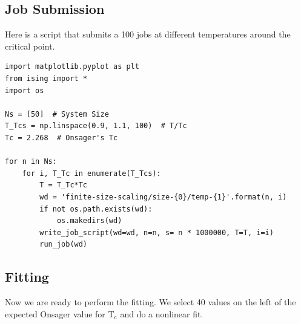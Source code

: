 \documentclass{article}
\begin{document}
\subsection{Job Submission}
\label{sec-6-1}

Here is a script that submits a 100 jobs at different temperatures around the critical point.
\begin{verbatim}
import matplotlib.pyplot as plt
from ising import *
import os

Ns = [50]  # System Size
T_Tcs = np.linspace(0.9, 1.1, 100)  # T/Tc
Tc = 2.268  # Onsager's Tc

for n in Ns:
    for i, T_Tc in enumerate(T_Tcs):
        T = T_Tc*Tc
        wd = 'finite-size-scaling/size-{0}/temp-{1}'.format(n, i)
        if not os.path.exists(wd): 
            os.makedirs(wd)
        write_job_script(wd=wd, n=n, s= n * 1000000, T=T, i=i)
        run_job(wd)
\end{verbatim}

\subsection{Fitting}
\label{sec-6-2}

Now we are ready to perform the fitting. We select 40 values on the left of the expected Onsager value for T$_{\text{c}}$ and do a nonlinear fit.
\end{document}
